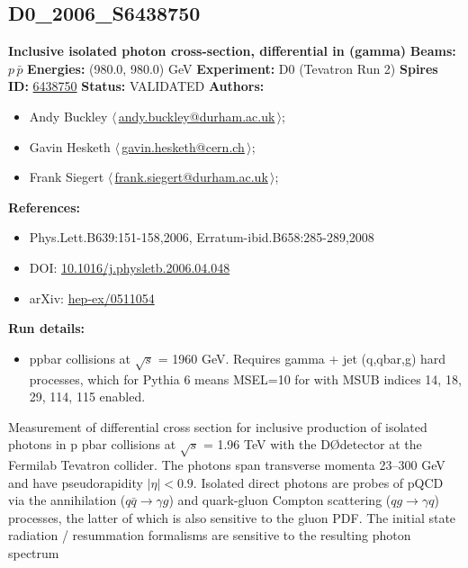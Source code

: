 \subsection[D0\_2006\_S6438750]{D0\_2006\_S6438750\,\cite{Abazov:2005wc}}
\textbf{Inclusive isolated photon cross-section, differential in \pT(gamma)}\newline
\textbf{Beams:} $p$\,$\bar{p}$ \newline
\textbf{Energies:} (980.0, 980.0) GeV \newline
\textbf{Experiment:} D0 (Tevatron Run 2) \newline
\textbf{Spires ID:} \href{http://www.slac.stanford.edu/spires/find/hep/www?rawcmd=key+6438750}{6438750}\newline
\textbf{Status:} VALIDATED\newline
\textbf{Authors:}
\begin{itemize}
  \item Andy Buckley $\langle\,$\href{mailto:andy.buckley@durham.ac.uk}{andy.buckley@durham.ac.uk}$\,\rangle$;
  \item Gavin Hesketh $\langle\,$\href{mailto:gavin.hesketh@cern.ch}{gavin.hesketh@cern.ch}$\,\rangle$;
  \item Frank Siegert $\langle\,$\href{mailto:frank.siegert@durham.ac.uk}{frank.siegert@durham.ac.uk}$\,\rangle$;
\end{itemize}
\textbf{References:}
\begin{itemize}
  \item Phys.Lett.B639:151-158,2006, Erratum-ibid.B658:285-289,2008
  \item DOI: \href{http://dx.doi.org/10.1016/j.physletb.2006.04.048}{10.1016/j.physletb.2006.04.048}
  \item arXiv: \href{http://arxiv.org/abs/hep-ex/0511054}{hep-ex/0511054}
\end{itemize}
\textbf{Run details:}
\begin{itemize}

  \item ppbar collisions at \ensuremath{\sqrt{s}} = 1960 GeV. Requires gamma + jet (q,qbar,g) hard processes, which for Pythia 6 means MSEL=10 for with MSUB indices 14, 18, 29, 114, 115 enabled.\end{itemize}

\noindent Measurement of differential cross section for inclusive production of isolated photons in p pbar collisions at \ensuremath{\sqrt{s}} = 1.96 TeV with the D\O detector at the Fermilab Tevatron collider. The photons span transverse momenta 23--300 GeV and have pseudorapidity $|\eta| < 0.9$. Isolated direct photons are probes of pQCD via the annihilation ($q \bar{q} \ensuremath{\to} \gamma g$) and quark-gluon Compton scattering ($q g \ensuremath{\to} \gamma q$) processes, the latter of which is also sensitive to the gluon PDF. The initial state radiation / resummation formalisms are sensitive to the resulting photon \pT spectrum


